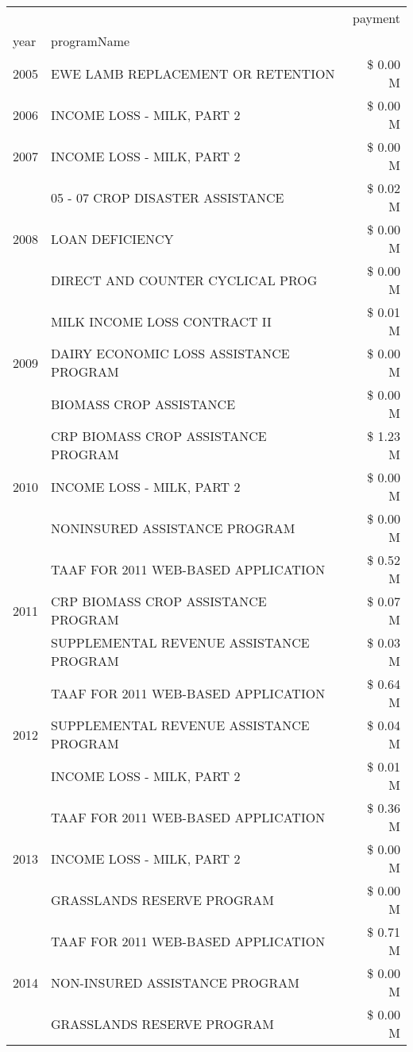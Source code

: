 \begin{tabular}{llr}
\toprule
 &  & payment \\
year & programName &  \\
\midrule
2005 & EWE LAMB REPLACEMENT OR RETENTION & \$ 0.00 M \\
\cline{1-3}
2006 & INCOME LOSS - MILK, PART 2 & \$ 0.00 M \\
\cline{1-3}
2007 & INCOME LOSS - MILK, PART 2 & \$ 0.00 M \\
\cline{1-3}
\multirow[t]{3}{*}{2008} & 05 - 07 CROP DISASTER ASSISTANCE & \$ 0.02 M \\
 & LOAN DEFICIENCY & \$ 0.00 M \\
 & DIRECT AND COUNTER CYCLICAL PROG & \$ 0.00 M \\
\cline{1-3}
\multirow[t]{3}{*}{2009} & MILK INCOME LOSS CONTRACT II & \$ 0.01 M \\
 & DAIRY ECONOMIC LOSS ASSISTANCE PROGRAM & \$ 0.00 M \\
 & BIOMASS CROP ASSISTANCE & \$ 0.00 M \\
\cline{1-3}
\multirow[t]{3}{*}{2010} & CRP BIOMASS CROP ASSISTANCE PROGRAM & \$ 1.23 M \\
 & INCOME LOSS - MILK, PART 2 & \$ 0.00 M \\
 & NONINSURED ASSISTANCE PROGRAM & \$ 0.00 M \\
\cline{1-3}
\multirow[t]{3}{*}{2011} & TAAF FOR 2011 WEB-BASED APPLICATION & \$ 0.52 M \\
 & CRP BIOMASS CROP ASSISTANCE PROGRAM & \$ 0.07 M \\
 & SUPPLEMENTAL REVENUE ASSISTANCE PROGRAM & \$ 0.03 M \\
\cline{1-3}
\multirow[t]{3}{*}{2012} & TAAF FOR 2011 WEB-BASED APPLICATION & \$ 0.64 M \\
 & SUPPLEMENTAL REVENUE ASSISTANCE PROGRAM & \$ 0.04 M \\
 & INCOME LOSS - MILK, PART 2 & \$ 0.01 M \\
\cline{1-3}
\multirow[t]{3}{*}{2013} & TAAF FOR 2011 WEB-BASED APPLICATION & \$ 0.36 M \\
 & INCOME LOSS - MILK, PART 2 & \$ 0.00 M \\
 & GRASSLANDS RESERVE PROGRAM & \$ 0.00 M \\
\cline{1-3}
\multirow[t]{3}{*}{2014} & TAAF FOR 2011 WEB-BASED APPLICATION & \$ 0.71 M \\
 & NON-INSURED ASSISTANCE PROGRAM & \$ 0.00 M \\
 & GRASSLANDS RESERVE PROGRAM & \$ 0.00 M \\

\end{tabular}
